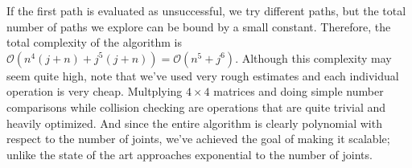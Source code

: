If the first path is evaluated as unsuccessful, we try different paths, but the total number of paths we explore can be bound by a small constant. Therefore, the total complexity of the algorithm is $\mathcal{O}(n^4(j+n)+j^5(j+n)) = \mathcal{O}(n^5+j^6)$. Although this complexity may seem quite high, note that we've used very rough estimates and each individual operation is very cheap. Multplying $4 \times 4$ matrices and doing simple number comparisons while collision checking are operations that are quite trivial and heavily optimized. And since the entire algorithm is clearly polynomial with respect to the number of joints, we've achieved the goal of making it scalable; unlike the state of the art approaches exponential to the number of joints.
